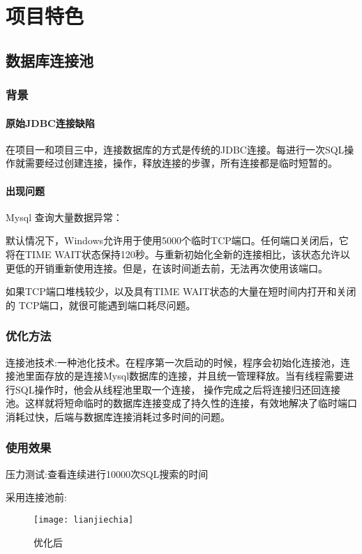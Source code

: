 \chapter{项目特色}
\section{数据库连接池}
\subsection{背景}

\subsubsection{原始JDBC连接缺陷}
在项目一和项目三中，连接数据库的方式是传统的JDBC连接。每进行一次SQL操作就需要经过创建连接，操作，释放连接的步骤，所有连接都是临时短暂的。

\subsubsection{出现问题}
Mysql 查询大量数据异常：

默认情况下，Windows允许用于使用5000个临时TCP端口。任何端口关闭后，它将在TIME WAIT状态保持120秒。与重新初始化全新的连接相比，该状态允许以更低的开销重新使用连接。但是，在该时间逝去前，无法再次使用该端口。

如果TCP端口堆栈较少，以及具有TIME WAIT状态的大量在短时间内打开和关闭的 TCP端口，就很可能遇到端口耗尽问题。

\subsection{优化方法}
连接池技术:一种池化技术。在程序第一次启动的时候，程序会初始化连接池，连接池里面存放的是连接Mysql数据库的连接，并且统一管理释放。当有线程需要进行SQL操作时，他会从线程池里取一个连接，
操作完成之后将连接归还回连接池。这样就将短命临时的数据库连接变成了持久性的连接，有效地解决了临时端口消耗过快，后端与数据库连接消耗过多时间的问题。

\subsection{使用效果}

压力测试:查看连续进行10000次SQL搜索的时间

采用连接池前:
\begin{figure}[htbp]
	\centering
	\texttt{[image: lianjiechia]}
	\caption{优化后}
	\vspace{\baselineskip}
\end{figure}

